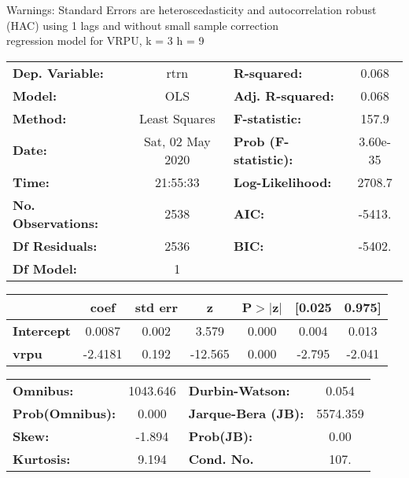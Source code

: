 Warnings: \newline
 [1] Standard Errors are heteroscedasticity and autocorrelation robust (HAC) using 1 lags and without small sample correction\\ 

regression model for VRPU, k = 3 h = 9\begin{center}
\begin{tabular}{lclc}
\toprule
\textbf{Dep. Variable:}    &       rtrn       & \textbf{  R-squared:         } &     0.068   \\
\textbf{Model:}            &       OLS        & \textbf{  Adj. R-squared:    } &     0.068   \\
\textbf{Method:}           &  Least Squares   & \textbf{  F-statistic:       } &     157.9   \\
\textbf{Date:}             & Sat, 02 May 2020 & \textbf{  Prob (F-statistic):} &  3.60e-35   \\
\textbf{Time:}             &     21:55:33     & \textbf{  Log-Likelihood:    } &    2708.7   \\
\textbf{No. Observations:} &        2538      & \textbf{  AIC:               } &    -5413.   \\
\textbf{Df Residuals:}     &        2536      & \textbf{  BIC:               } &    -5402.   \\
\textbf{Df Model:}         &           1      & \textbf{                     } &             \\
\bottomrule
\end{tabular}
\begin{tabular}{lcccccc}
                   & \textbf{coef} & \textbf{std err} & \textbf{z} & \textbf{P$> |$z$|$} & \textbf{[0.025} & \textbf{0.975]}  \\
\midrule
\textbf{Intercept} &       0.0087  &        0.002     &     3.579  &         0.000        &        0.004    &        0.013     \\
\textbf{vrpu}      &      -2.4181  &        0.192     &   -12.565  &         0.000        &       -2.795    &       -2.041     \\
\bottomrule
\end{tabular}
\begin{tabular}{lclc}
\textbf{Omnibus:}       & 1043.646 & \textbf{  Durbin-Watson:     } &    0.054  \\
\textbf{Prob(Omnibus):} &   0.000  & \textbf{  Jarque-Bera (JB):  } & 5574.359  \\
\textbf{Skew:}          &  -1.894  & \textbf{  Prob(JB):          } &     0.00  \\
\textbf{Kurtosis:}      &   9.194  & \textbf{  Cond. No.          } &     107.  \\
\bottomrule
\end{tabular}
\end{center}

